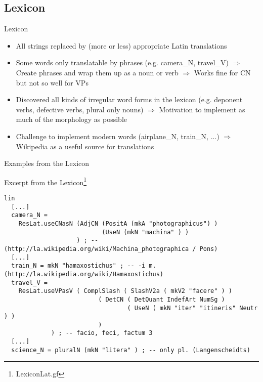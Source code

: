 \documentclass{beamer}
\begin{document}
\subsection{Lexicon}
\begin{frame}[fragile]{Lexicon}
\begin{itemize}
  \item All strings replaced by (more or less) appropriate Latin translations
  \item Some words only translatable by phrases (e.g. camera\_N, travel\_V) $\Rightarrow$ Create phrases and wrap them up as a noun or verb $\Rightarrow$ Works fine for CN but not so well for VPs
  \item Discovered all kinds of irregular word forms in the lexicon (e.g. deponent verbs, defective verbs, plural only nouns) $\Rightarrow$ Motivation to implement as much of the morphology as possible
  \item Challenge to implement modern words (airplane\_N, train\_N, ...) $\Rightarrow$ Wikipedia as a useful source for translations 
\end{itemize}
\end{frame}
\begin{frame}[fragile]{Examples from the Lexicon}
\begin{example}{Excerpt from the Lexicon\footnote{LexiconLat.gf}}
\begin{Verbatim}[fontsize=\tiny,commandchars=\\\{\}]
lin
  [...]
  camera_N = 
    ResLat.useCNasN (AdjCN (PositA (mkA "photographicus") ) 
                           (UseN (mkN "machina" ) ) 
                    ) ; -- (http://la.wikipedia.org/wiki/Machina_photographica / Pons)
  [...]
  train_N = mkN "hamaxostichus" ; -- -i m. (http://la.wikipedia.org/wiki/Hamaxostichus)
  travel_V = 
    ResLat.useVPasV ( ComplSlash ( SlashV2a ( mkV2 "facere" ) ) 
                          ( DetCN ( DetQuant IndefArt NumSg ) 
                                  ( UseN ( mkN "iter" "itineris" Neutr ) ) 
                          ) 
             ) ; -- facio, feci, factum 3 
  [...]
  science_N = pluralN (mkN "litera" ) ; -- only pl. (Langenscheidts)
\end{Verbatim}
\end{example}
\end{frame}
\end{document}
